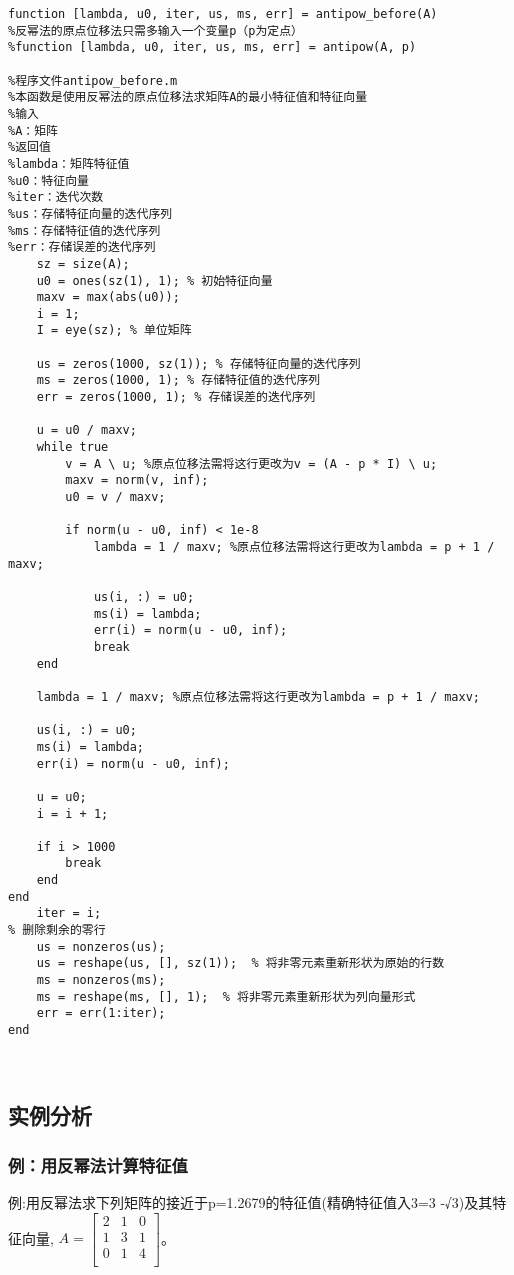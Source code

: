 \documentclass[12pt, a4paper, oneside]{ctexart}
\begin{document}
\begin{lstlisting}
function [lambda, u0, iter, us, ms, err] = antipow_before(A)
%反幂法的原点位移法只需多输入一个变量p（p为定点）
%function [lambda, u0, iter, us, ms, err] = antipow(A, p)

%程序文件antipow_before.m
%本函数是使用反幂法的原点位移法求矩阵A的最小特征值和特征向量
%输入
%A：矩阵
%返回值
%lambda：矩阵特征值
%u0：特征向量
%iter：迭代次数
%us：存储特征向量的迭代序列
%ms：存储特征值的迭代序列
%err：存储误差的迭代序列
	sz = size(A);
	u0 = ones(sz(1), 1); % 初始特征向量
	maxv = max(abs(u0));
	i = 1;
	I = eye(sz); % 单位矩阵
	
	us = zeros(1000, sz(1)); % 存储特征向量的迭代序列
	ms = zeros(1000, 1); % 存储特征值的迭代序列
	err = zeros(1000, 1); % 存储误差的迭代序列
	
	u = u0 / maxv;
	while true
		v = A \ u; %原点位移法需将这行更改为v = (A - p * I) \ u;
		maxv = norm(v, inf);
		u0 = v / maxv;
		
		if norm(u - u0, inf) < 1e-8
			lambda = 1 / maxv; %原点位移法需将这行更改为lambda = p + 1 / maxv;
			
			us(i, :) = u0;
			ms(i) = lambda;
			err(i) = norm(u - u0, inf);
			break
	end
	
	lambda = 1 / maxv; %原点位移法需将这行更改为lambda = p + 1 / maxv;
	
	us(i, :) = u0;
	ms(i) = lambda;
	err(i) = norm(u - u0, inf);
	
	u = u0;
	i = i + 1;
	
	if i > 1000
		break
	end
end
	iter = i;
% 删除剩余的零行
	us = nonzeros(us);
	us = reshape(us, [], sz(1));  % 将非零元素重新形状为原始的行数
	ms = nonzeros(ms);
	ms = reshape(ms, [], 1);  % 将非零元素重新形状为列向量形式
	err = err(1:iter);
end



\end{lstlisting}
\subsection{实例分析}
\subsubsection{例：用反幂法计算特征值}
 例:用反幂法求下列矩阵的接近于p=1.2679的特征值(精确特征值入3=3 -√3)及其特征向量, 
$A = \begin{bmatrix}
	2 & 1 & 0 \\
	1 & 3 & 1 \\
	0 & 1 & 4 \\
\end{bmatrix}$。
\end{document}
